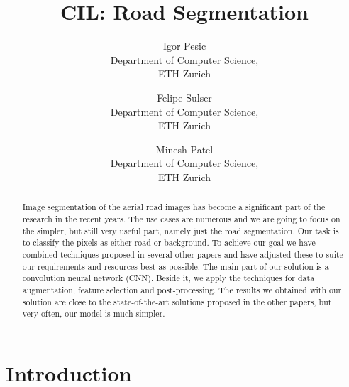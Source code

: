 \documentclass[10pt,conference,compsocconf]{IEEEtran}
\begin{document}
\title{CIL: Road Segmentation}

\author{
  Igor Pesic\\
  Department of Computer Science,\\ ETH Zurich
  \and
  Felipe Sulser\\
  Department of Computer Science,\\ ETH Zurich
  \and
  Minesh Patel\\
  Department of Computer Science,\\ ETH Zurich
}

\maketitle

\begin{abstract}
  Image segmentation of the aerial road images has become a significant part of the research in the recent years.
  The use cases are numerous and we are going to focus on the simpler, but still very useful part, namely just the road
  segmentation. Our task is to classify the pixels as either road or background. To achieve our goal we have combined
  techniques proposed in several other papers and have adjusted these to suite our requirements and resources best as possible.  
  The main part of our solution is a convolution neural network (CNN). Beside it, we apply the techniques for data augmentation,
  feature selection and post-processing. The results we obtained with our solution are close to the state-of-the-art
  solutions proposed in the other papers, but very often, our model is much simpler.
\end{abstract}

\section{Introduction}
\end{document}

